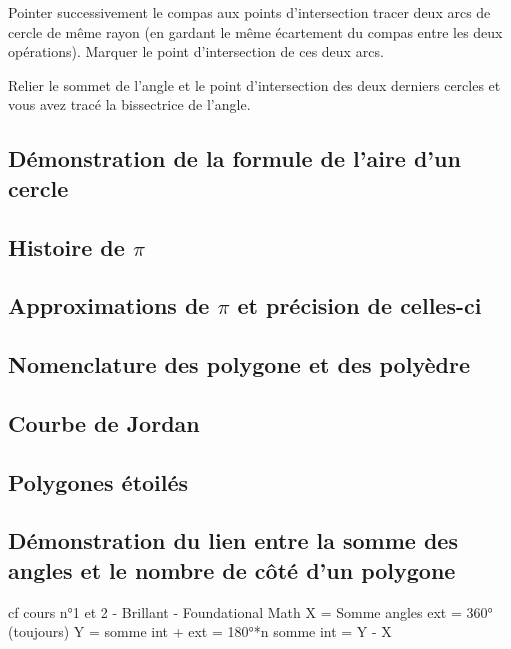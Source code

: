 \documentclass[a4paper, twoside]{article}
\begin{document}
Pointer successivement le compas aux points d'intersection tracer deux arcs de cercle de même rayon (en gardant le même écartement du compas entre les deux opérations). Marquer le point d'intersection de ces deux arcs.

Relier le sommet de l'angle et le point d'intersection des deux derniers cercles et vous avez tracé la bissectrice de l'angle.


\subsection*{Démonstration de la formule de l'aire d'un cercle} \label{demo_formule_aire_cercle}


\subsection*{Histoire de $\pi$} \label{histoire_de_pi}

\subsection*{Approximations de $\pi$ et précision de celles-ci} \label{approximations_pi}

\subsection*{Nomenclature des polygone et des polyèdre} \label{nomenclature_polygone_polyèdre}


\subsection*{Courbe de Jordan} \label{courbe_Jordan}

\subsection*{Polygones étoilés} \label{polygone_etoile}

\subsection*{Démonstration du lien entre la somme des angles et le nombre de côté d'un polygone} \label{demo_formule_lien_somme_angle_nb_cote}

cf cours n°1 et 2 - Brillant - Foundational Math
X = Somme angles ext = 360° (toujours)
Y = somme int + ext = 180°*n
somme int = Y - X
\end{document}
